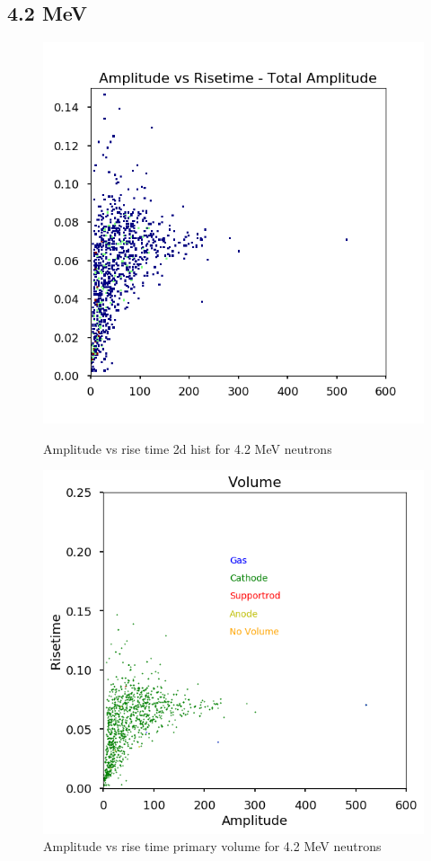 \documentclass[a4paper]{article}
\begin{document}
\subsection{4.2 MeV}
\begin{figure}[H]
    \centering
    \begin{minipage}{.5\textwidth}
        \centering
        \includegraphics[width=1\linewidth]{Fast/steel_achinos-2d_fast-3.png}
        \caption{Amplitude vs rise time 2d hist for 4.2 MeV neutrons}
        \label{fig:prob1_6_2}
    \end{minipage}%
    \begin{minipage}{0.5\textwidth}
        \centering
        \includegraphics[width=1\linewidth]{Fast/steel_achinos_vol_38_fast-3.png}
        \caption{Amplitude vs rise time primary volume for 4.2 MeV neutrons}
        \label{fig:prob1_6_1}
    \end{minipage}
\end{figure}
\end{document}
